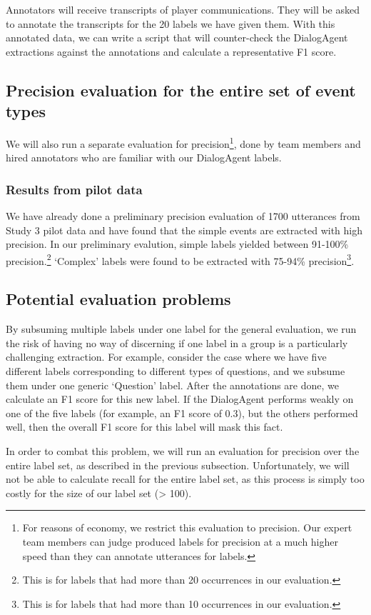 Annotators will receive transcripts of player communications. They will be
asked to annotate the transcripts for the 20 labels we have given them. With
this annotated data, we can write a script that will counter-check the
DialogAgent extractions against the annotations and calculate a representative
F1 score.

\subsection{Precision evaluation for the entire set of event types}

We will also run a separate evaluation for precision\footnote{For reasons of
economy, we restrict this evaluation to precision. Our expert team members can
judge produced labels for precision at a much higher speed than they can
annotate utterances for labels.}, done by team members and hired annotators who
are familiar with our DialogAgent labels.


\subsubsection{Results from pilot data} 

We have already done a preliminary precision evaluation of 1700 utterances from
Study 3 pilot data and have found that the simple events are extracted with
high precision.  In our preliminary evalution, simple labels yielded between
91-100\% precision.\footnote{This is for labels that had more than 20
occurrences in our evaluation.} `Complex' labels were found to be extracted
with 75-94\% precision\footnote{This is for labels that had more than 10
occurrences in our evaluation.}.

\subsection{Potential evaluation problems}

By subsuming multiple labels under one label for the general evaluation, we run
the risk of having no way of discerning if one label in a group is a
particularly challenging extraction. For example, consider the case where we
have five different labels corresponding to different types of questions, and
we subsume them under one generic `Question' label. After the annotations are
done, we calculate an F1 score for this new label. If the DialogAgent performs
weakly on one of the five labels (for example, an F1 score of 0.3), but the
others performed well, then the overall F1 score for this label will mask this
fact.

In order to combat this problem, we will run an evaluation for precision over
the entire label set, as described in the previous subsection. Unfortunately,
we will not be able to calculate recall for the entire label set, as this
process is simply too costly for the size of our label set (> 100).
